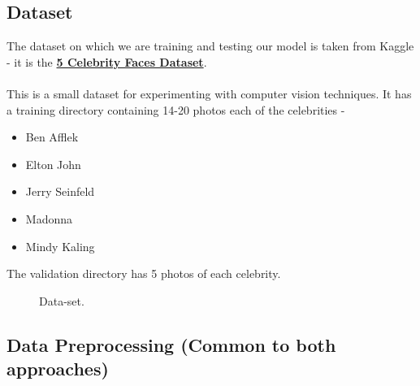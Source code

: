 \documentclass{article}
\begin{document}

    \subsection{Dataset}

    The dataset on which we are training and testing our model is taken from Kaggle - it is the \href{https://www.kaggle.com/dansbecker/5-celebrity-faces-dataset}{\textbf{5 Celebrity Faces Dataset}}.
\\\\
    This is a small dataset for experimenting with computer vision techniques. It has a training directory containing 14-20 photos each of the celebrities - 

    \begin{itemize}
        \item Ben Afflek 
        \item Elton John 
        \item Jerry Seinfeld 
        \item Madonna 
        \item Mindy Kaling 
    \end{itemize}  
    
    The validation directory has 5 photos of each celebrity.
    \begin{figure}[!hbt]
        \noindent{}
        \caption{Data-set.}
    \end{figure}

    \subsection{Data Preprocessing (Common to both approaches) }
\end{document}
